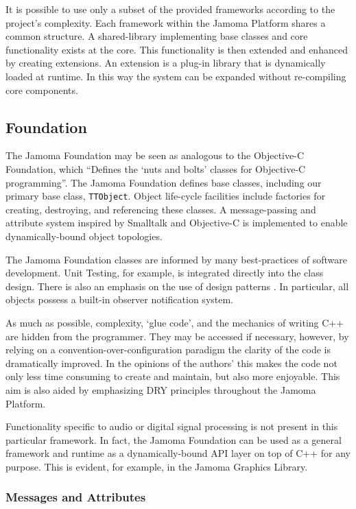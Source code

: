 \documentclass[twoside,10pt]{article}
\begin{document}
It is possible to use only a subset of the provided frameworks according to the project's complexity. 
Each framework within the Jamoma Platform shares a common structure.  A shared-library implementing base classes and core functionality exists at the core.  This functionality is then extended and enhanced by creating extensions.  An extension is a plug-in library that is dynamically loaded at runtime.  In this way the system can be expanded without re-compiling core components.



\subsection{Foundation} %

The Jamoma Foundation \cite{web7} may be seen as analogous to the Objective-C Foundation, which ``Defines the `nuts and bolts' classes for Objective-C programming''\cite{web8}.  The Jamoma Foundation defines base classes, including our primary base class, \texttt{TTObject}.  Object life-cycle facilities include factories for creating, destroying, and referencing these classes.  A message-passing and attribute system inspired by Smalltalk and Objective-C is implemented to enable dynamically-bound object topologies.  

The Jamoma Foundation classes are informed by many best-practices of software development.  Unit Testing, for example, is integrated directly into the class design.  There is also an emphasis on the use of design patterns \cite{Gamma:1995}.  In particular, all objects possess a built-in observer notification system.  

As much as possible, complexity, `glue code', and the mechanics of writing C++ are hidden from the programmer.  They may be accessed if necessary, however, by relying on a convention-over-configuration paradigm the clarity of the code is dramatically improved.  In the opinions of the authors' this makes the code not only less time consuming to create and maintain, but also more enjoyable.  This aim is also aided by emphasizing DRY principles throughout the Jamoma Platform.

Functionality specific to audio or digital signal processing is not present in this particular framework.  In fact, the Jamoma Foundation can be used as a general framework and runtime as a dynamically-bound API layer on top of C++ for any purpose.  This is evident, for example, in the Jamoma Graphics Library.

\subsubsection{Messages and Attributes} %
\end{document}

